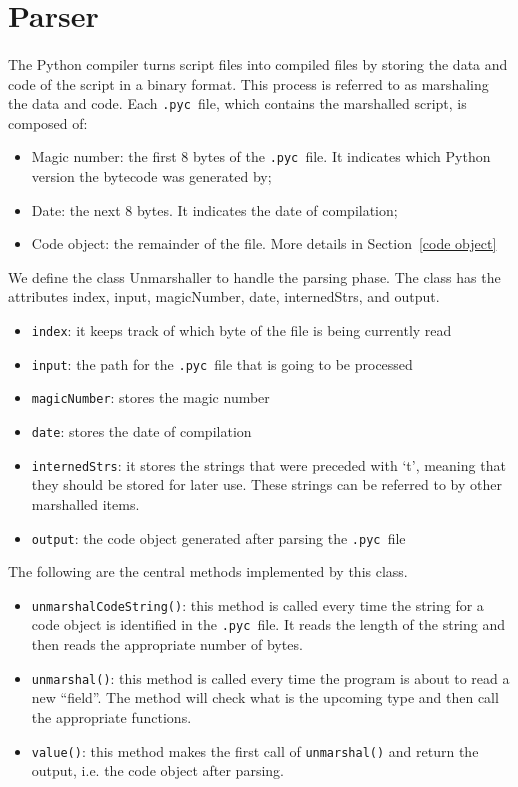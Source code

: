 \documentclass{article}
\newcommand{\pyc}{\texttt{.pyc~}}
\begin{document}
\section{Parser}\label{parser}

\paragraph{}
The Python compiler turns script files into compiled files by storing the data and code of the script in a binary format. This process is referred to as marshaling the data and code. Each \pyc file, which contains the marshalled script, is composed of:

\begin{itemize}
	\item Magic number: the first 8 bytes of the \pyc file. It indicates which Python version the bytecode was generated by;
	\item Date: the next 8 bytes. It indicates the date of compilation;
	\item Code object: the remainder of the file. More details in Section~\ref{code object}
\end{itemize}

We define the class Unmarshaller to handle the parsing phase. The class has the attributes index, input, magicNumber, date, internedStrs, and output.

\begin{itemize}
	\item \texttt{index}: it keeps track of which byte of the file is being currently read 
	\item \texttt{input}: the path for the \pyc file that is going to be processed
	\item \texttt{magicNumber}: stores the magic number
	\item \texttt{date}: stores the date of compilation
	\item \texttt{internedStrs}: it stores the strings that were preceded with `t', meaning that they should be stored for later use. These strings can be referred to by other marshalled items.
	\item \texttt{output}: the code object generated after parsing the \pyc file
\end{itemize}

The following are the central methods implemented by this class.

\begin{itemize}
	\item \texttt{unmarshalCodeString()}:  this method is called every time the string for a code object is identified in the \pyc file. It reads the length of the string and then reads the appropriate number of bytes.
	\item \texttt{unmarshal()}: this method is called every time the program is about to read a new ``field''. The method will check what is the upcoming type and then call the appropriate functions.
	\item \texttt{value()}: this method makes the first call of \texttt{unmarshal()} and return the output, i.e. the code object after parsing.
\end{itemize}
\end{document}
